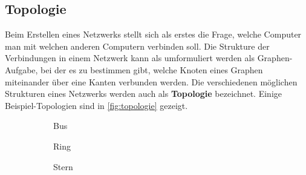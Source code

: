 \subsection{Topologie}
Beim Erstellen eines Netzwerks stellt sich als erstes die Frage, welche Computer man mit welchen anderen Computern verbinden soll. Die Strukture der Verbindungen in einem Netzwerk kann als umformuliert werden als Graphen-Aufgabe, bei der es zu bestimmen gibt, welche Knoten eines Graphen miteinander über eine Kanten verbunden werden. Die verschiedenen möglichen Strukturen eines Netzwerks werden auch als \textbf{Topologie} bezeichnet. Einige Beispiel-Topologien sind in \cref{fig:topologie} gezeigt.
\begin{figure}[H]
\centering
\centering
\begin{subfigure}[b]{0.25\textwidth}
  \centering
  \caption{Bus}
\end{subfigure}%
\begin{subfigure}[b]{0.25\textwidth}
  \centering
  \caption{Ring}
\end{subfigure}
\begin{subfigure}[b]{0.25\textwidth}
  \centering
  \caption{Stern}
\end{subfigure}%
\begin{subfigure}[b]{0.25\textwidth}
  \centering
{}
\end{subfigure}
\end{figure}
